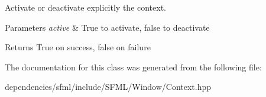 Activate or deactivate explicitly the context. 


\begin{DoxyParams}{Parameters}
{\em active} & True to activate, false to deactivate\\
\hline
\end{DoxyParams}
\begin{DoxyReturn}{Returns}
True on success, false on failure 
\end{DoxyReturn}


The documentation for this class was generated from the following file\+:\begin{DoxyCompactItemize}
\item 
dependencies/sfml/include/\+S\+F\+M\+L/\+Window/Context.\+hpp\end{DoxyCompactItemize}

